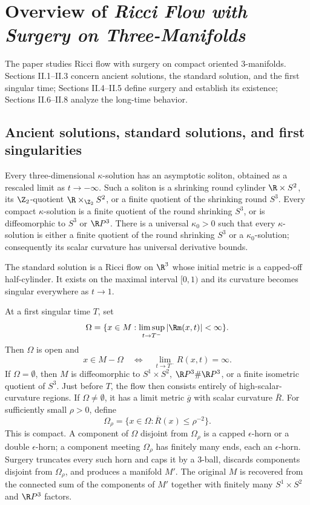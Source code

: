 \section{Overview of
\emph{Ricci Flow with Surgery on Three-Manifolds} \cite{Perelman2}} \label{overview2}

The paper studies Ricci flow with surgery on compact oriented $3$-manifolds.
Sections II.1--II.3 concern ancient solutions, the standard solution, and the
first singular time; Sections II.4--II.5 define surgery and establish its
existence; Sections II.6--II.8 analyze the long-time behavior.

\subsection{Ancient solutions, standard solutions, and first singularities}

Every three-dimensional $\kappa$-solution has an asymptotic soliton, obtained
as a rescaled limit as $t\to-\infty$. Such a soliton is a shrinking round
cylinder $\R\times S^2$, its $\Z_2$-quotient
$\R\times_{\Z_2}S^2$, or a finite quotient of the shrinking round $S^3$.
Every compact $\kappa$-solution is a finite quotient of the round shrinking
$S^3$, or is diffeomorphic to $S^3$ or $\R P^3$. There is a universal
$\kappa_0>0$ such that every $\kappa$-solution is either a finite quotient of
the round shrinking $S^3$ or a $\kappa_0$-solution; consequently its scalar
curvature has universal derivative bounds.

The standard solution is a Ricci flow on $\R^3$ whose initial metric is a
capped-off half-cylinder. It exists on the maximal interval $[0,1)$ and its
curvature becomes singular everywhere as $t\to1$.

At a first singular time $T$, set
\[
\Omega=\{x\in M:\limsup_{t\to T^-}|\Rm(x,t)|<\infty\}.
\]
Then $\Omega$ is open and
\[
x\in M-\Omega\quad\Longleftrightarrow\quad
\lim_{t\to T^-}R(x,t)=\infty.
\]
If $\Omega=\emptyset$, then $M$ is diffeomorphic to
$S^1\times S^2$, $\R P^3\#\R P^3$, or a finite isometric quotient of
$S^3$. Just before $T$, the flow then consists entirely of
high-scalar-curvature regions. If $\Omega\ne\emptyset$, it has a limit metric $\overline g$ with
scalar curvature $\overline R$. For sufficiently small $\rho>0$, define
\[
\Omega_\rho=\{x\in\Omega:\overline R(x)\le\rho^{-2}\}.
\]
This is compact. A component of $\Omega$ disjoint from $\Omega_\rho$ is a
capped $\epsilon$-horn or a double $\epsilon$-horn; a component meeting
$\Omega_\rho$ has finitely many ends, each an $\epsilon$-horn. Surgery
truncates every such horn and caps it by a $3$-ball, discards components
disjoint from $\Omega_\rho$, and produces a manifold $M'$. The original $M$
is recovered from the connected sum of the components of $M'$ together with
finitely many $S^1\times S^2$ and $\R P^3$ factors.

